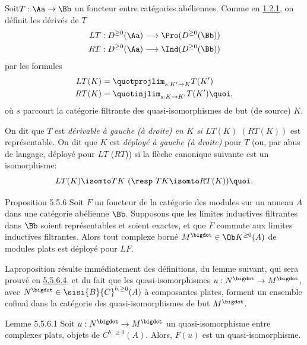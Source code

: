 \documentclass[10pt]{../fichiers-configuration-latex/smfart}
\begin{document}
\setcounter{subsubsection}{4}
\subsubsection{}
Soit\pageoriginale $T:\Aa\rightarrow \Bb$ un foncteur
entre catégories abéliennes. Comme en \hyperref[XVII.def1.2.1]{1.2.1}, on définit les dérivés de
$T$
\begin{align*}
LT &: D^{\geq 0}(\Aa)\longrightarrow \Pro(D^{\geq
0}(\Bb))\\
RT &: D^{\geq 0}(\Aa)\longrightarrow \Ind(D^{\geq 0}(\Bb))
\end{align*}
par les formules
\begin{align*}
LT(K) &= \quotprojlim_{s:K'\rightarrow K}T(K')\\
RT(K) &= \quotinjlim_{s:K\rightarrow K'}T(K'){\quoi},
\end{align*}
où $s$ parcourt la catégorie filtrante des quasi-isomorphismes de but
(\resp de source) $K$.

On dit que $T$ est \emph{dérivable à gauche (\resp à droite) en $K$ si
$LT(K)$} $(RT(K))$ est représentable. On dit que $K$ est \emph{déployé
à gauche (\resp à droite)} pour $T$ (ou, par abus de langage,
déployé pour $LT$ (\resp $RT$)) si la flèche canonique suivante est un
isomorphisme:
\[
LT(K)\isomto  TK\text{ (\resp $TK \isomto  RT(K)$)}{\quoi}.
\]

\begin{enonce*}{Proposition 5.5.6}
Soit $F$ un foncteur de la catégorie des modules sur un anneau $A$
dans une catégorie abélienne $\Bb$. Supposons que les limites
inductives filtrantes dans $\Bb$ soient représentables et
soient exactes, et que $F$ commute aux limites inductives
filtrantes. Alors tout complexe borné $M^{\bigdot}\in \Ob K^{\geq
0}(A)$ de modules plats est déployé pour $LF$.
\end{enonce*}

La\pageoriginale proposition résulte immédiatement des définitions, du
lemme suivant, qui sera prouvé en \hyperref[XVII.par5.5.6.4]{5.5.6.4}, et du fait que les
quasi-isomorphismes $u:N^{\bigdot}\rightarrow M^{\bigdot}$, avec
$N^{\bigdot}\in \sisi{B}{C}^{b,\geq 0}(A)$ à composantes plates, forment un
ensemble cofinal dans la catégorie des quasi-isomorphismes de but
$M^{\bigdot}$.

\begin{enonce*}{Lemme 5.5.6.1}
Soit $u:N^{\bigdot}\rightarrow M^{\bigdot}$ un quasi-isomorphisme
entre complexes plats, objets de $C^{b,\geq 0}(A)$. Alors, $F(u)$ est
un quasi-isomorphisme.
\end{enonce*}
\end{document}

